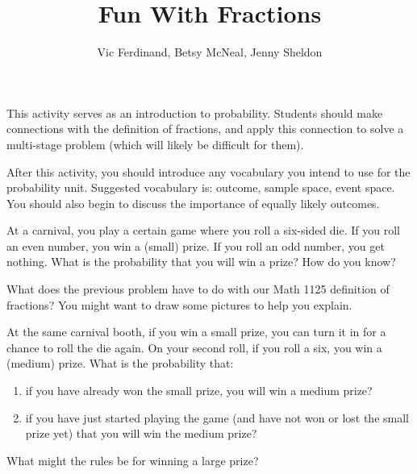 \documentclass{ximera}
\title{Fun With Fractions}
\author{Vic Ferdinand, Betsy McNeal, Jenny Sheldon}
\begin{document}
\begin{abstract}
\end{abstract}
\maketitle

\begin{instructorIntro}
This activity serves as an introduction to probability.  Students should make connections with the definition of fractions, and apply this connection to solve a multi-stage problem (which will likely be difficult for them).

After this activity, you should introduce any vocabulary you intend to use for the probability unit.  Suggested vocabulary is: outcome, sample space, event space.  You should also begin to discuss the importance of equally likely outcomes.
\end{instructorIntro}

\begin{problem}
At a carnival, you play a certain game where you roll a six-sided die.  If you roll an even number, you win a (small) prize.  If you roll an odd number, you get nothing.  What is the probability that you will win a prize?  How do you know?
\end{problem}

\begin{problem}
What does the previous problem have to do with our Math 1125 definition of fractions?  You might want to draw some pictures to help you explain.
\end{problem}

\begin{problem}
At the same carnival booth, if you win a small prize, you can turn it in for a chance to roll the die again.  On your second roll, if you roll a six, you win a (medium) prize.  What is the probability that:
\begin{enumerate}
\item if you have already won the small prize, you will win a medium prize?
\item if you have just started playing the game (and have not won or lost the small prize yet) that you will win the medium prize?
\end{enumerate}

\end{problem}

\begin{problem}
What might the rules be for winning a large prize?
\end{problem}
\end{document}
